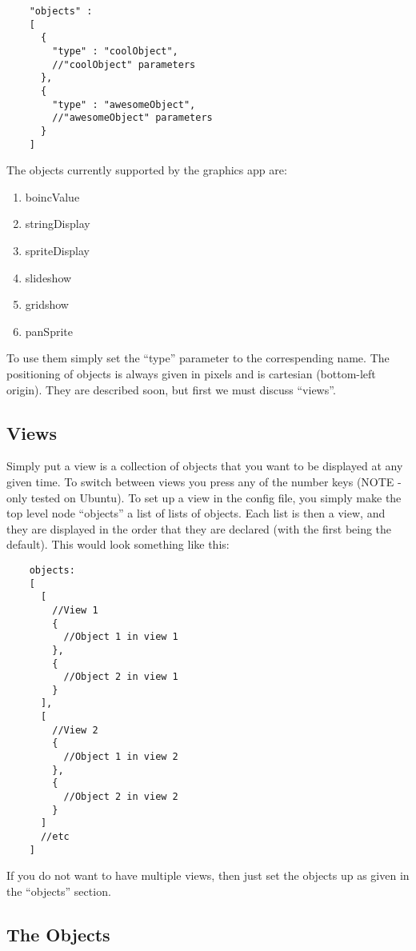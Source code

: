 \documentclass[a4paper]{article}
\begin{document}
  \begin{verbatim}
    "objects" :
    [
      {
        "type" : "coolObject",
        //"coolObject" parameters
      },
      {
        "type" : "awesomeObject",
        //"awesomeObject" parameters
      }
    ]
  \end{verbatim}

  The objects currently supported by the graphics app are:
  \begin{enumerate}
    \item boincValue
    \item stringDisplay
    \item spriteDisplay
    \item slideshow
    \item gridshow
    \item panSprite
  \end{enumerate}

  To use them simply set the ``type'' parameter to the correspending name.
  The positioning of objects is always given in pixels and is cartesian
  (bottom-left origin).
  They are described soon, but first we must discuss ``views''.

  \subsection{Views}
  Simply put a view is a collection of objects that you want to be
  displayed at any given time. To switch between views you press any of the
  number keys (NOTE - only tested on Ubuntu). To set up a view in the config
  file, you simply make the top level node ``objects'' a list of lists of
  objects. Each list is then a view, and they are displayed in the order
  that they are declared (with the first being the default). This would look
  something like this:

  \begin{verbatim}
    objects:
    [
      [
        //View 1
        {
          //Object 1 in view 1
        },
        {
          //Object 2 in view 1
        }
      ],
      [
        //View 2
        {
          //Object 1 in view 2
        },
        {
          //Object 2 in view 2
        }
      ]
      //etc
    ]
  \end{verbatim}

  If you do not want to have multiple views, then just set the objects up
  as given in the ``objects'' section.

  \subsection{The Objects}
\end{document}
